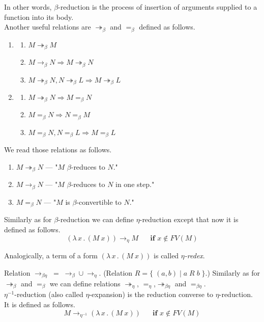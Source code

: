 \documentclass{sig-alternate}
\newcommand{\then}{\Rightarrow\xspace}
\newcommand{\lamb}[2]{( \lambda \, #1 \, . \, #2 )}
\newcommand{\bbarr}{\twoheadrightarrow_\beta}
\newcommand{\barr}{\rightarrow_\beta}
\newcommand{\beq}{=_\beta}
\newcommand{\eearr}{\twoheadrightarrow_\eta}
\newcommand{\earr}{\rightarrow_\eta}
\newcommand{\eeq}{=_\eta}
\newcommand{\bearr}{\rightarrow_{\beta\eta}}
\newcommand{\bbeearr}{\twoheadrightarrow_{\beta\eta}}
\newcommand{\beeq}{=_{\beta\eta}}
\newcommand{\eArrow}{\rightarrow_\eta\xspace}
\newcommand{\eeArrow}{\rightarrow_{\eta^{-1}}\xspace}
\begin{document}
In other words, $\beta$-reduction is the process 
of insertion of arguments supplied to a function into 
its body. \\

Another useful relations are $\bbarr$ and $\beq$ defined as follows. 

\begin{enumerate}
 \item \begin{enumerate}
 	\item $M \bbarr M$
 	\item $M \barr N \then M \bbarr N$
 	\item $M \bbarr N , N \bbarr L \then M \bbarr L$ 	
 \end{enumerate}
 \item \begin{enumerate}
 	\item $M \bbarr N \then M \beq N$
 	\item $M \beq N \then N \beq M$
 	\item $M \beq N , N \beq L \then M \beq L$
 \end{enumerate}

\end{enumerate}

We read those relations as follows.
\begin{enumerate}
 	\item $M \bbarr N$ --- "$M$ $\beta$-reduces to $N$."  
 	\item $M \barr N$  --- "$M$ $\beta$-reduces to $N$
 	      in one step."
 	\item $M \beq N$ --- "$M$ is $\beta$-convertible to $N$."	
 \end{enumerate}


Similarly as for $\beta$-reduction we can define $\eta$-reduction except that now it is defined as follows.  
$$\lamb{x}{(M~x)} \eArrow M \textbf{ ~~~~if } x \not\in FV(M) $$

Analogically, a term of a form $\lamb{x}{(M~x)}$ is called 
\textit{$\eta$-redex}.

Relation $\bearr\;=\;\barr \cup \earr$. 
(Relation $R = \{\;(a,b)\;|\;a\;R\;b\;\}$.)
Similarly as for $\bbarr$ and $\beq$ we can define relations 
$\eearr$, $\eeq$,$\bbeearr$ and $\beeq$.\\

$\eta^{-1}$-reduction (also called $\eta$-expansion) is 
the reduction converse to $\eta$-reduction.
It is defined as follows.  
$$M \eeArrow \lamb{x}{(M~x)} \textbf{ ~~~~if } x \not\in FV(M) $$
\end{document}
